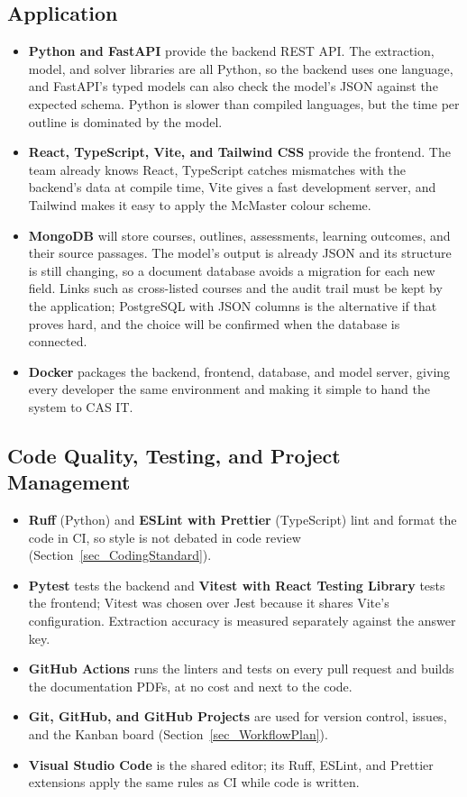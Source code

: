 \documentclass{article}
\begin{document}
\subsection{Application}

\begin{itemize}
\item \textbf{Python and FastAPI} provide the backend REST API. The extraction,
model, and solver libraries are all Python, so the backend uses one language,
and FastAPI's typed models can also check the model's JSON against the expected
schema. Python is slower than compiled languages, but the time per outline is
dominated by the model.

\item \textbf{React, TypeScript, Vite, and Tailwind CSS} provide the frontend.
The team already knows React, TypeScript catches mismatches with the backend's
data at compile time, Vite gives a fast development server, and Tailwind makes
it easy to apply the McMaster colour scheme.

\item \textbf{MongoDB} will store courses, outlines, assessments, learning
outcomes, and their source passages. The model's output is already JSON and its
structure is still changing, so a document database avoids a migration for
each new field. Links such as cross-listed courses and the audit trail must be
kept by the application; PostgreSQL with JSON columns is the alternative if
that proves hard, and the choice will be confirmed when the database is
connected.

\item \textbf{Docker} packages the backend, frontend, database, and model
server, giving every developer the same environment and making it simple to
hand the system to CAS IT.
\end{itemize}

\subsection{Code Quality, Testing, and Project Management}

\begin{itemize}
\item \textbf{Ruff} (Python) and \textbf{ESLint with Prettier} (TypeScript)
lint and format the code in CI, so style is not debated in code review
(Section~\ref{sec_CodingStandard}).
\item \textbf{Pytest} tests the backend and \textbf{Vitest with React Testing
Library} tests the frontend; Vitest was chosen over Jest because it shares
Vite's configuration. Extraction accuracy is measured separately against the
answer key.
\item \textbf{GitHub Actions} runs the linters and tests on every pull request
and builds the documentation PDFs, at no cost and next to the code.
\item \textbf{Git, GitHub, and GitHub Projects} are used for version control,
issues, and the Kanban board (Section~\ref{sec_WorkflowPlan}).
\item \textbf{Visual Studio Code} is the shared editor; its Ruff, ESLint, and
Prettier extensions apply the same rules as CI while code is written.
\end{itemize}
\end{document}
